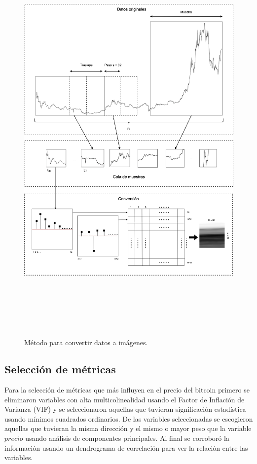 \begin{figure}[h!]
	\includegraphics[width=\textwidth,height=21cm]{Chapter3/3-2.png}
	\caption{Método para convertir datos a imágenes.}
	\label{fig: met5}
\end{figure}

\subsection{Selección de métricas}
\label{ssec:metrics}
Para la selección de métricas que más influyen en el precio del bitcoin primero se eliminaron variables con alta multicolinealidad usando el Factor de Inflación de Varianza (VIF) y se seleccionaron aquellas que tuvieran significación estadística usando mínimos cuadrados ordinarios. De las variables seleccionadas se escogieron aquellas que tuvieran la misma dirección y el mismo o mayor peso que la variable $precio$ usando análisis de componentes principales. Al final se corroboró la información usando un dendrograma de correlación para ver la relación entre las variables.

